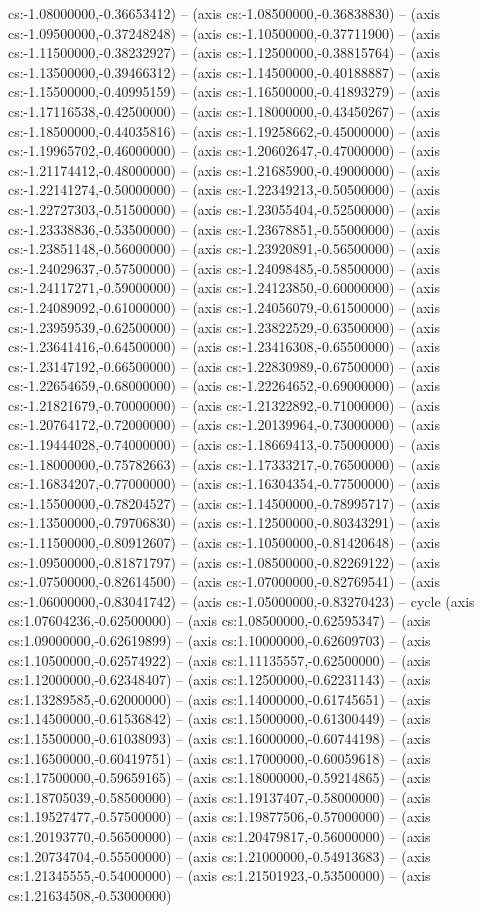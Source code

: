 cs:-1.08000000,-0.36653412) -- (axis cs:-1.08500000,-0.36838830) -- (axis cs:-1.09500000,-0.37248248) -- (axis cs:-1.10500000,-0.37711900) -- (axis cs:-1.11500000,-0.38232927) -- (axis cs:-1.12500000,-0.38815764) -- (axis cs:-1.13500000,-0.39466312) -- (axis cs:-1.14500000,-0.40188887) -- (axis cs:-1.15500000,-0.40995159) -- (axis cs:-1.16500000,-0.41893279) -- (axis cs:-1.17116538,-0.42500000) -- (axis cs:-1.18000000,-0.43450267) -- (axis cs:-1.18500000,-0.44035816) -- (axis cs:-1.19258662,-0.45000000) -- (axis cs:-1.19965702,-0.46000000) -- (axis cs:-1.20602647,-0.47000000) -- (axis cs:-1.21174412,-0.48000000) -- (axis cs:-1.21685900,-0.49000000) -- (axis cs:-1.22141274,-0.50000000) -- (axis cs:-1.22349213,-0.50500000) -- (axis cs:-1.22727303,-0.51500000) -- (axis cs:-1.23055404,-0.52500000) -- (axis cs:-1.23338836,-0.53500000) -- (axis cs:-1.23678851,-0.55000000) -- (axis cs:-1.23851148,-0.56000000) -- (axis cs:-1.23920891,-0.56500000) -- (axis cs:-1.24029637,-0.57500000) -- (axis cs:-1.24098485,-0.58500000) -- (axis cs:-1.24117271,-0.59000000) -- (axis cs:-1.24123850,-0.60000000) -- (axis cs:-1.24089092,-0.61000000) -- (axis cs:-1.24056079,-0.61500000) -- (axis cs:-1.23959539,-0.62500000) -- (axis cs:-1.23822529,-0.63500000) -- (axis cs:-1.23641416,-0.64500000) -- (axis cs:-1.23416308,-0.65500000) -- (axis cs:-1.23147192,-0.66500000) -- (axis cs:-1.22830989,-0.67500000) -- (axis cs:-1.22654659,-0.68000000) -- (axis cs:-1.22264652,-0.69000000) -- (axis cs:-1.21821679,-0.70000000) -- (axis cs:-1.21322892,-0.71000000) -- (axis cs:-1.20764172,-0.72000000) -- (axis cs:-1.20139964,-0.73000000) -- (axis cs:-1.19444028,-0.74000000) -- (axis cs:-1.18669413,-0.75000000) -- (axis cs:-1.18000000,-0.75782663) -- (axis cs:-1.17333217,-0.76500000) -- (axis cs:-1.16834207,-0.77000000) -- (axis cs:-1.16304354,-0.77500000) -- (axis cs:-1.15500000,-0.78204527) -- (axis cs:-1.14500000,-0.78995717) -- (axis cs:-1.13500000,-0.79706830) -- (axis cs:-1.12500000,-0.80343291) -- (axis cs:-1.11500000,-0.80912607) -- (axis cs:-1.10500000,-0.81420648) -- (axis cs:-1.09500000,-0.81871797) -- (axis cs:-1.08500000,-0.82269122) -- (axis cs:-1.07500000,-0.82614500) -- (axis cs:-1.07000000,-0.82769541) -- (axis cs:-1.06000000,-0.83041742) -- (axis cs:-1.05000000,-0.83270423) -- cycle (axis cs:1.07604236,-0.62500000) -- (axis cs:1.08500000,-0.62595347) -- (axis cs:1.09000000,-0.62619899) -- (axis cs:1.10000000,-0.62609703) -- (axis cs:1.10500000,-0.62574922) -- (axis cs:1.11135557,-0.62500000) -- (axis cs:1.12000000,-0.62348407) -- (axis cs:1.12500000,-0.62231143) -- (axis cs:1.13289585,-0.62000000) -- (axis cs:1.14000000,-0.61745651) -- (axis cs:1.14500000,-0.61536842) -- (axis cs:1.15000000,-0.61300449) -- (axis cs:1.15500000,-0.61038093) -- (axis cs:1.16000000,-0.60744198) -- (axis cs:1.16500000,-0.60419751) -- (axis cs:1.17000000,-0.60059618) -- (axis cs:1.17500000,-0.59659165) -- (axis cs:1.18000000,-0.59214865) -- (axis cs:1.18705039,-0.58500000) -- (axis cs:1.19137407,-0.58000000) -- (axis cs:1.19527477,-0.57500000) -- (axis cs:1.19877506,-0.57000000) -- (axis cs:1.20193770,-0.56500000) -- (axis cs:1.20479817,-0.56000000) -- (axis cs:1.20734704,-0.55500000) -- (axis cs:1.21000000,-0.54913683) -- (axis cs:1.21345555,-0.54000000) -- (axis cs:1.21501923,-0.53500000) -- (axis cs:1.21634508,-0.53000000) 